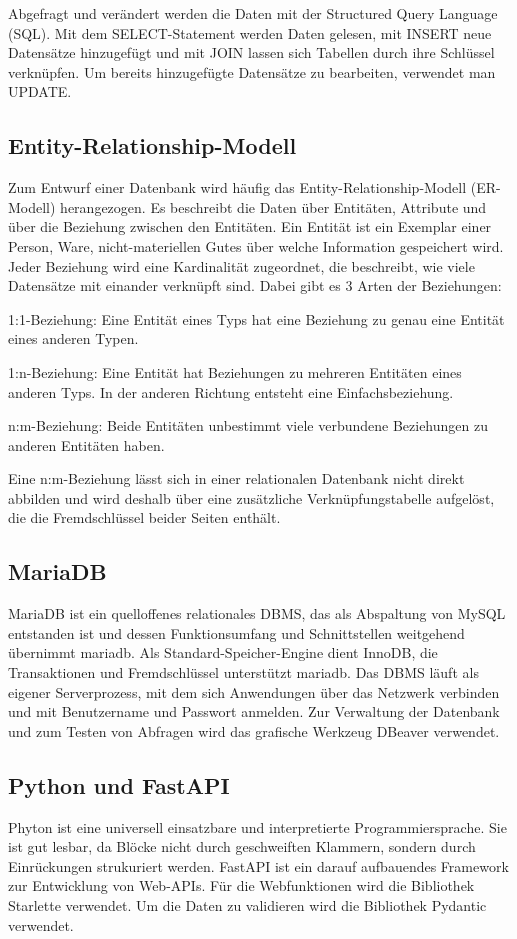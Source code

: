 Abgefragt und verändert werden die Daten mit der Structured Query Language
(SQL). Mit dem SELECT-Statement werden Daten gelesen, mit INSERT neue 
Datensätze hinzugefügt und mit JOIN lassen sich Tabellen durch ihre Schlüssel
verknüpfen. Um bereits hinzugefügte Datensätze zu bearbeiten, verwendet man UPDATE. 

\subsection{Entity-Relationship-Modell}
\label{sec:er-modell}
Zum Entwurf einer Datenbank wird häufig das Entity-Relationship-Modell
(ER-Modell) herangezogen. Es beschreibt die Daten über
Entitäten, Attribute und über die Beziehung zwischen den Entitäten. 
Ein Entität ist ein Exemplar einer Person, Ware, 
nicht-materiellen Gutes über welche Information gespeichert wird. 
Jeder Beziehung wird eine Kardinalität zugeordnet, die beschreibt, wie viele 
Datensätze mit einander verknüpft sind. Dabei gibt es 3 Arten der Beziehungen: 

1:1-Beziehung: Eine Entität eines Typs hat eine Beziehung zu genau eine Entität eines anderen Typen. 

1:n-Beziehung: Eine Entität hat Beziehungen zu mehreren Entitäten eines anderen Typs. 
In der anderen Richtung entsteht eine Einfachsbeziehung.

n:m-Beziehung: Beide Entitäten unbestimmt viele verbundene Beziehungen zu anderen Entitäten haben. 

Eine n:m-Beziehung lässt sich in einer relationalen Datenbank nicht
direkt abbilden und wird deshalb über eine zusätzliche Verknüpfungstabelle
aufgelöst, die die Fremdschlüssel beider Seiten enthält.

\subsection{MariaDB}
MariaDB ist ein quelloffenes relationales DBMS, das als Abspaltung von MySQL
entstanden ist und dessen Funktionsumfang und Schnittstellen weitgehend
übernimmt mariadb. Als Standard-Speicher-Engine dient InnoDB, die
Transaktionen und Fremdschlüssel unterstützt mariadb. Das DBMS läuft als
eigener Serverprozess, mit dem sich Anwendungen über das Netzwerk verbinden und
mit Benutzername und Passwort anmelden. Zur Verwaltung der Datenbank und zum
Testen von Abfragen wird das grafische Werkzeug DBeaver verwendet.

\subsection{Python und FastAPI}
Phyton ist eine universell einsatzbare und interpretierte Programmiersprache. 
Sie ist gut lesbar, da Blöcke nicht durch geschweiften Klammern, sondern durch
Einrückungen strukuriert werden. FastAPI ist ein darauf aufbauendes Framework zur 
Entwicklung von Web-APIs. Für die Webfunktionen wird die Bibliothek Starlette
verwendet. Um die Daten zu validieren wird die Bibliothek Pydantic verwendet.


